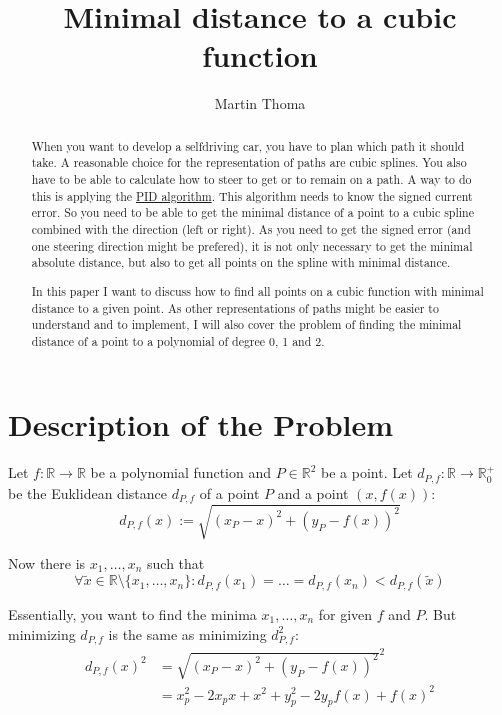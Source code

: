 \documentclass[a4paper]{scrartcl}
\title{Minimal distance to a cubic function}
\author{Martin Thoma}
\theoremstyle{break}
\def\mdr{\ensuremath{\mathbb{R}}}
\theoremstyle{nonumberplain}
\def\mdr{\ensuremath{\mathbb{R}}}
\begin{document}
\maketitle
\begin{abstract}
When you want to develop a selfdriving car, you have to plan which path 
it should take. A reasonable choice for the representation of
paths are cubic splines. You also have to be able to calculate
how to steer to get or to remain on a path. A way to do this
is applying the \href{https://en.wikipedia.org/wiki/PID_algorithm}{PID algorithm}.
This algorithm needs to know the signed current error. So you need to 
be able to get the minimal distance of a point to a cubic spline combined with the direction (left or right).
As you need to get the signed error (and one steering direction might
be prefered), it is not only necessary to
get the minimal absolute distance, but also to get all points
on the spline with minimal distance.

In this paper I want to discuss how to find all points on a cubic 
function with minimal distance to a given point.
As other representations of paths might be easier to understand and
to implement, I will also cover the problem of finding the minimal
distance of a point to a polynomial of degree 0, 1 and 2.
\end{abstract}

\section{Description of the Problem}
Let $f: \mdr \rightarrow \mdr$ be a polynomial function and $P \in \mdr^2$
be a point. Let $d_{P,f}: \mdr \rightarrow \mdr_0^+$
be the Euklidean distance $d_{P,f}$ of a point $P$ and a point $\left (x, f(x) \right )$:
\[d_{P,f} (x) := \sqrt{(x_P - x)^2 + (y_P - f(x))^2}\]

Now there is  $x_1, \dots, x_n$ such that 
\[\forall \tilde x \in \mathbb{R} \setminus \{x_1, \dots, x_n\}: d_{P,f}(x_1) = \dots = d_{P,f}(x_n) < d_{P,f}(\tilde x)\]

Essentially, you want to find the minima $x_1, \dots, x_n$ for given 
$f$ and $P$.
But minimizing $d_{P,f}$ is the same as minimizing $d_{P,f}^2$:
\begin{align}
    d_{P,f}(x)^2    &= \sqrt{(x_P - x)^2 + (y_P - f(x))^2}^2\\
                &= x_p^2 - 2x_p x + x^2 + y_p^2 - 2y_p f(x) + f(x)^2
\end{align}
\end{document}
